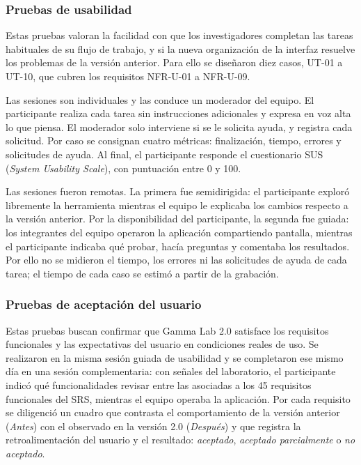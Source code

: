 \documentclass[12pt,letterpaper,oneside]{article}
\begin{document}
\subsubsection{Pruebas de usabilidad}

Estas pruebas valoran la facilidad con que los investigadores completan las tareas habituales de su flujo de trabajo, y si la nueva organización de la interfaz resuelve los problemas de la versión anterior. Para ello se diseñaron diez casos, UT-01 a UT-10, que cubren los requisitos NFR-U-01 a NFR-U-09.

Las sesiones son individuales y las conduce un moderador del equipo. El participante realiza cada tarea sin instrucciones adicionales y expresa en voz alta lo que piensa. El moderador solo interviene si se le solicita ayuda, y registra cada solicitud. Por caso se consignan cuatro métricas: finalización, tiempo, errores y solicitudes de ayuda. Al final, el participante responde el cuestionario SUS (\textit{System Usability Scale}), con puntuación entre 0 y 100.

Las sesiones fueron remotas. La primera fue semidirigida: el participante exploró libremente la herramienta mientras el equipo le explicaba los cambios respecto a la versión anterior. Por la disponibilidad del participante, la segunda fue guiada: los integrantes del equipo operaron la aplicación compartiendo pantalla, mientras el participante indicaba qué probar, hacía preguntas y comentaba los resultados. Por ello no se midieron el tiempo, los errores ni las solicitudes de ayuda de cada tarea; el tiempo de cada caso se estimó a partir de la grabación. 

\subsubsection{Pruebas de aceptación del usuario}

Estas pruebas buscan confirmar que Gamma Lab 2.0 satisface los requisitos funcionales y las expectativas del usuario en condiciones reales de uso. Se realizaron en la misma sesión guiada de usabilidad y se completaron ese mismo día en una sesión complementaria: con señales del laboratorio, el participante indicó qué funcionalidades revisar entre las asociadas a los 45 requisitos funcionales del SRS, mientras el equipo operaba la aplicación. Por cada requisito se diligenció un cuadro que contrasta el comportamiento de la versión anterior (\textit{Antes}) con el observado en la versión 2.0 (\textit{Después}) y que registra la retroalimentación del usuario y el resultado: \textit{aceptado}, \textit{aceptado parcialmente} o \textit{no aceptado}.
\end{document}
